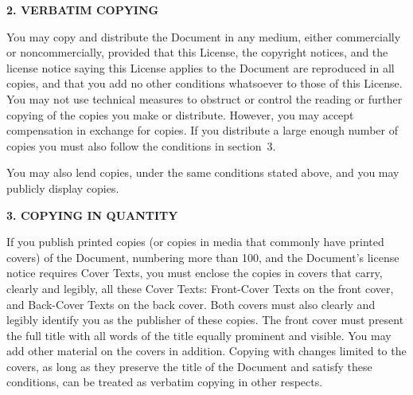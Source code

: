 \ifdefined\chs

\fi

\ifdefined\eng
\fi

\ifdefined\chs

\fi

\ifdefined\eng
\begin{center}
{\Large\bf 2. VERBATIM COPYING\par}
\end{center}
\fi

\ifdefined\chs

\fi

\ifdefined\eng
You may copy and distribute the Document in any medium, either
commercially or noncommercially, provided that this License, the
copyright notices, and the license notice saying this License applies
to the Document are reproduced in all copies, and that you add no other
conditions whatsoever to those of this License.  You may not use
technical measures to obstruct or control the reading or further
copying of the copies you make or distribute.  However, you may accept
compensation in exchange for copies.  If you distribute a large enough
number of copies you must also follow the conditions in section~3.
\fi

\ifdefined\chs

\fi

\ifdefined\eng
You may also lend copies, under the same conditions stated above, and
you may publicly display copies.
\fi

\ifdefined\chs

\fi

\ifdefined\eng
\fi

\ifdefined\chs

\fi

\ifdefined\eng
\begin{center}
{\Large\bf 3. COPYING IN QUANTITY\par}
\end{center}
\fi

\ifdefined\chs

\fi

\ifdefined\eng
\fi

\ifdefined\chs

\fi

\ifdefined\eng
If you publish printed copies (or copies in media that commonly have
printed covers) of the Document, numbering more than 100, and the
Document's license notice requires Cover Texts, you must enclose the
copies in covers that carry, clearly and legibly, all these Cover
Texts: Front-Cover Texts on the front cover, and Back-Cover Texts on
the back cover.  Both covers must also clearly and legibly identify
you as the publisher of these copies.  The front cover must present
the full title with all words of the title equally prominent and
visible.  You may add other material on the covers in addition.
Copying with changes limited to the covers, as long as they preserve
the title of the Document and satisfy these conditions, can be treated
as verbatim copying in other respects.
\fi

